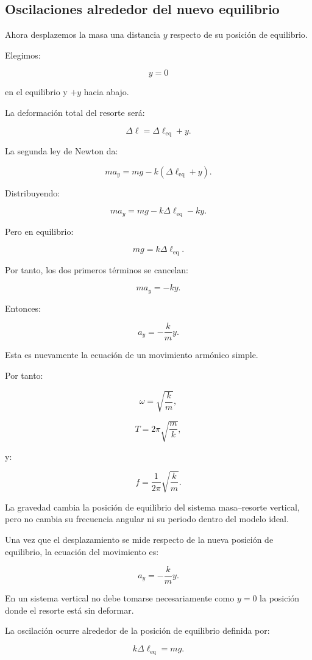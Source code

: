 \subsection{Oscilaciones alrededor del nuevo equilibrio}

Ahora desplazemos la masa una distancia \(y\) respecto de su posición de equilibrio.

Elegimos:

\[ y=0 \]

en el equilibrio y \(+y\) hacia abajo.

La deformación total del resorte será:

\[ \Delta\ell=\Delta\ell_{\mathrm{eq}}+y. \]

La segunda ley de Newton da:

\[ ma_y=mg-k(\Delta\ell_{\mathrm{eq}}+y). \]

Distribuyendo:

\[ ma_y=mg-k\Delta\ell_{\mathrm{eq}}-ky. \]

Pero en equilibrio:

\[ mg=k\Delta\ell_{\mathrm{eq}}. \]

Por tanto, los dos primeros términos se cancelan:

\[ ma_y=-ky. \]

Entonces:

\[ a_y=-\frac{k}{m}y. \]

Esta es nuevamente la ecuación de un movimiento armónico simple.

Por tanto:

\[ \boxed{\omega=\sqrt{\frac{k}{m}}}, \]

\[ \boxed{T=2\pi\sqrt{\frac{m}{k}}}, \]

y:

\[ \boxed{f=\frac{1}{2\pi}\sqrt{\frac{k}{m}}}. \]

\begin{principio}
La gravedad cambia la posición de equilibrio del sistema masa--resorte vertical, pero no cambia su frecuencia angular ni su periodo dentro del modelo ideal.

Una vez que el desplazamiento se mide respecto de la nueva posición de equilibrio, la ecuación del movimiento es:

\[ a_y=-\frac{k}{m}y. \]
\end{principio}

\begin{errorfrecuente}
En un sistema vertical no debe tomarse necesariamente como \(y=0\) la posición donde el resorte está sin deformar.

La oscilación ocurre alrededor de la posición de equilibrio definida por:

\[ k\Delta\ell_{\mathrm{eq}}=mg. \]
\end{errorfrecuente}


